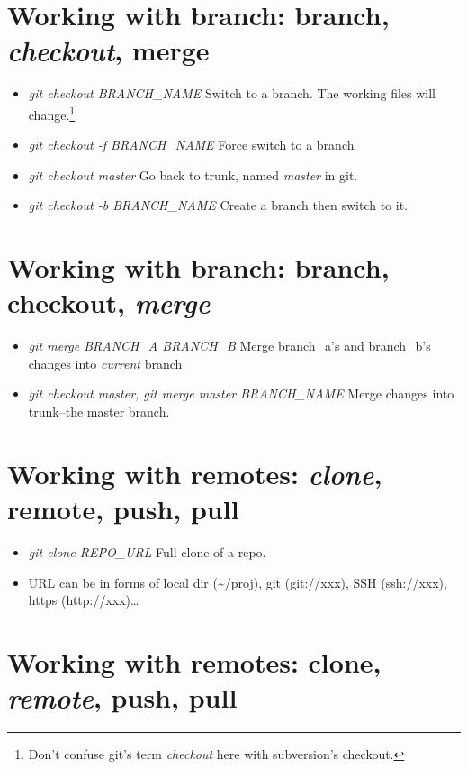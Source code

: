 \documentclass[]{article}
\begin{document}
\section{Working with \textbf{branch}: branch, \emph{checkout}, merge}

\begin{itemize}
\item
  \emph{git checkout BRANCH\_NAME} Switch to a branch. The working files
  will change.\footnote{Don't confuse git's term \emph{checkout} here
    with subversion's checkout.}
\item
  \emph{git checkout -f BRANCH\_NAME} Force switch to a branch
\item
  \emph{git checkout master} Go back to trunk, named \emph{master} in
  git.
\item
  \emph{git checkout -b BRANCH\_NAME} Create a branch then switch to it.
\end{itemize}
\section{Working with \textbf{branch}: branch, checkout, \emph{merge}}

\begin{itemize}
\item
  \emph{git merge BRANCH\_A BRANCH\_B} Merge branch\_a's and branch\_b's
  changes into \emph{current} branch
\item
  \emph{git checkout master, git merge master BRANCH\_NAME} Merge
  changes into trunk--the master branch.
\end{itemize}
\section{Working with \textbf{remotes}: \emph{clone}, remote, push,
pull}

\begin{itemize}
\item
  \emph{git clone REPO\_URL} Full clone of a repo.
\item
  URL can be in forms of local dir (\textasciitilde{}/proj), git
  (git://xxx), SSH (ssh://xxx), https (http://xxx)\ldots{}
\end{itemize}
\section{Working with \textbf{remotes}: clone, \emph{remote}, push,
pull}
\end{document}
